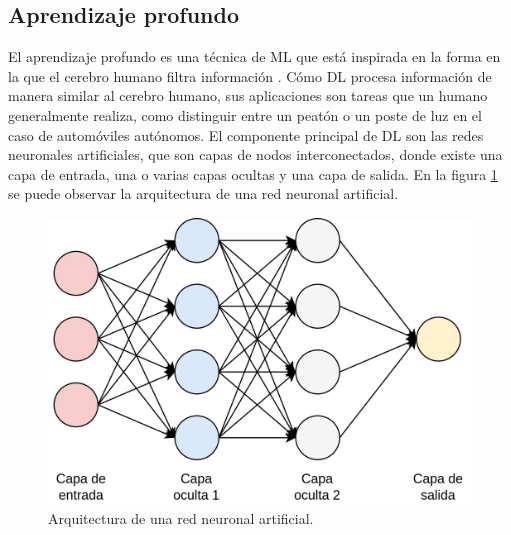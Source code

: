 \subsection{Aprendizaje profundo}
El aprendizaje profundo es una técnica de ML que está inspirada en la forma en la que el cerebro humano filtra información \cite{dl_def}. Cómo DL procesa información de manera similar al cerebro humano, sus aplicaciones son tareas que un humano generalmente realiza, como distinguir entre un peatón o un poste de luz en el caso de automóviles autónomos. El componente principal de DL son las redes neuronales artificiales, que son capas de nodos interconectados, donde existe una capa de entrada, una o varias capas ocultas y una capa de salida. En la figura \ref{fig:dl_nn} se puede observar la arquitectura de una red neuronal artificial.
\begin{figure}[h]
	\centering
	\includegraphics[scale=0.25]{./Figures/dl_nn.png}
	\caption{Arquitectura de una red neuronal artificial.}
	\label{fig:dl_nn}
\end{figure}


